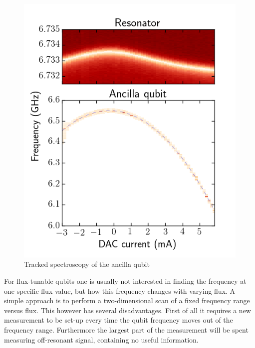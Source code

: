         \begin{figure}
          \begin{center}
          \vspace{-30pt}
            \includegraphics[width=\textwidth]{../Figures/Qubit characterization/Tracked_spectroscopy.png}
          \end{center}
          \vspace{-20 pt}
          \caption{Tracked spectroscopy of the ancilla qubit}
          \label{fig:tracked spectroscopy}
        \end{figure}

        For flux-tunable qubits one is usually not interested in finding the frequency at one specific flux value, but how this frequency changes with varying flux. A simple approach is to perform a two-dimensional scan of a fixed frequency range versus flux. This however has several disadvantages. First of all it requires a new measurement to be set-up every time the qubit frequency moves out of the frequency range. Furthermore the largest part of the measurement will be spent measuring off-resonant signal, containing no useful information.

